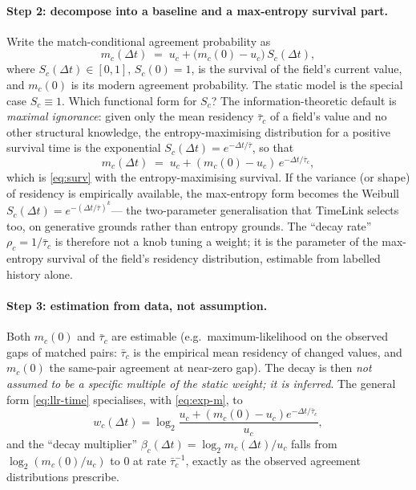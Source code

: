 \documentclass[11pt]{article}
\newcommand{\dt}{\Delta t}
\begin{document}
\paragraph{Step 2: decompose into a baseline and a max-entropy survival part.}
Write the match-conditional agreement probability as
\begin{equation}
  m_c(\dt) \;=\; u_c + \bigl(m_c(0)-u_c\bigr)\, S_c(\dt),
  \label{eq:surv}
\end{equation}
where $S_c(\dt)\in[0,1]$, $S_c(0)=1$, is the survival of the field's current value, and
$m_c(0)$ is its modern agreement probability. The static model is the special case
$S_c\equiv1$. Which functional form for $S_c$? The information-theoretic default is
\emph{maximal ignorance}: given only the mean residency $\bar\tau_c$ of a field's value
and no other structural knowledge, the entropy-maximising distribution for a positive
survival time is the exponential $S_c(\dt)=e^{-\dt/\bar\tau}$, so that
\begin{equation}
  m_c(\dt) \;=\; u_c + (m_c(0)-u_c)\, e^{-\dt/\bar\tau_c},
  \label{eq:exp-m}
\end{equation}
which is \eqref{eq:surv} with the entropy-maximising survival. If the variance (or
shape) of residency is empirically available, the max-entropy form becomes the Weibull
$S_c(\dt)=e^{-(\dt/\bar\tau)^k}$--- the two-parameter generalisation that TimeLink
selects too, on generative grounds rather than entropy grounds. The ``decay rate''
$\rho_c=1/\bar\tau_c$ is therefore not a knob tuning a weight; it is the parameter of
the max-entropy survival of the field's residency distribution, estimable from labelled
history alone.

\paragraph{Step 3: estimation from data, not assumption.}
Both $m_c(0)$ and $\bar\tau_c$ are estimable (e.g.\ maximum-likelihood on the observed
gaps of matched pairs: $\bar\tau_c$ is the empirical mean residency of changed values,
and $m_c(0)$ the same-pair agreement at near-zero gap). The decay is then \emph{not
assumed to be a specific multiple of the static weight; it is inferred}. The general
form \eqref{eq:llr-time} specialises, with \eqref{eq:exp-m}, to
\begin{equation}
  w_c(\dt) = \log_2\frac{u_c + (m_c(0)-u_c)e^{-\dt/\bar\tau_c}}{u_c},
  \label{eq:weight-entropy}
\end{equation}
and the ``decay multiplier'' $\beta_c(\dt)=\log_2 m_c(\dt)/u_c$ falls from
$\log_2(m_c(0)/u_c)$ to $0$ at rate $\bar\tau_c^{-1}$, exactly as the observed
agreement distributions prescribe.
\end{document}
